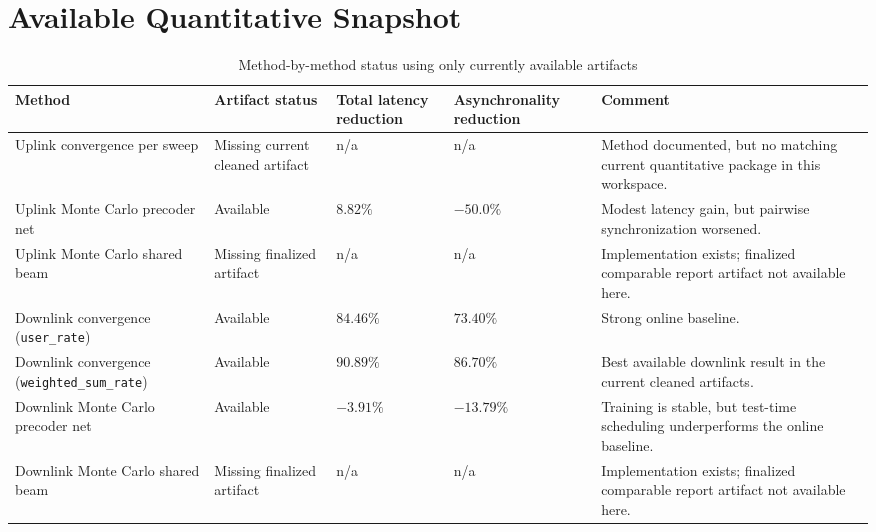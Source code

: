 \documentclass[11pt]{article}
\begin{document}
\section{Available Quantitative Snapshot}
\begin{table}[ht]
\centering
\small
\caption{Method-by-method status using only currently available artifacts}
\renewcommand{\arraystretch}{1.15}
\begin{tabularx}{\textwidth}{>{\raggedright\arraybackslash}p{} >{\raggedright\arraybackslash}p{} >{\centering\arraybackslash}p{} >{\centering\arraybackslash}p{} X}
\toprule
Method & Artifact status & Total latency reduction & Asynchronality reduction & Comment \\
\midrule
Uplink convergence per sweep & Missing current cleaned artifact & n/a & n/a & Method documented, but no matching current quantitative package in this workspace. \\
Uplink Monte Carlo precoder net & Available & \(8.82\%\) & \(-50.0\%\) & Modest latency gain, but pairwise synchronization worsened. \\
Uplink Monte Carlo shared beam & Missing finalized artifact & n/a & n/a & Implementation exists; finalized comparable report artifact not available here. \\
Downlink convergence (\texttt{user\_rate}) & Available & \(84.46\%\) & \(73.40\%\) & Strong online baseline. \\
Downlink convergence (\texttt{weighted\_sum\_rate}) & Available & \(90.89\%\) & \(86.70\%\) & Best available downlink result in the current cleaned artifacts. \\
Downlink Monte Carlo precoder net & Available & \(-3.91\%\) & \(-13.79\%\) & Training is stable, but test-time scheduling underperforms the online baseline. \\
Downlink Monte Carlo shared beam & Missing finalized artifact & n/a & n/a & Implementation exists; finalized comparable report artifact not available here. \\
\bottomrule
\end{tabularx}
\end{table}
\end{document}
